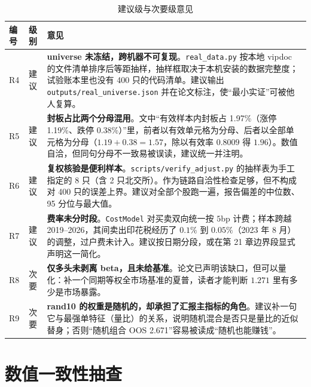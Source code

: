 \documentclass[11pt,a4paper]{ctexart}
\begin{document}
\begin{table}[htbp]
\centering
\caption{建议级与次要级意见}
\label{tab:minor2}
\begin{tabular}{@{}>{\raggedright\arraybackslash}p{0.9cm}>{\raggedright\arraybackslash}p{2.0cm}>{\raggedright\arraybackslash}p{9.7cm}@{}}
\toprule
编号 & 级别 & 意见 \\
\midrule
R4 & 建议 & \textbf{universe 未冻结，跨机器不可复现}。\texttt{real\_data.py} 按本地 vipdoc 的文件清单排序后等距抽样，抽样框取决于本机安装的数据完整度；试验账本里也没有 400 只的代码清单。建议输出 \texttt{outputs/real\_universe.json} 并在论文标注，使“最小实证”可被他人复算。 \\
R5 & 建议 & \textbf{封板占比两个分母混用}。文中“有效样本内封板占 1.97\%（涨停 1.19\%、跌停 0.38\%）”里，前者以有效单元格为分母、后者以全部单元格为分母（$1.19+0.38=1.57$，除以有效率 $0.8009$ 得 $1.96$）。数值自洽，但同句分母不一致易被误读，建议统一并注明。 \\
R6 & 建议 & \textbf{复权核验是便利样本}。\texttt{scripts/verify\_adjust.py} 的抽样表为手工指定的 8 只（含 2 只北交所）。作为链路自洽性检查足够，但不构成对 400 只的误差上界。建议对全部个股跑一遍，报告偏差的中位数、95 分位与最大值。 \\
R7 & 建议 & \textbf{费率未分时段}。\texttt{CostModel} 对买卖双向统一按 $5$bp 计费；样本跨越 2019--2026，其间卖出印花税经历了 $0.1\%$ 到 $0.05\%$（2023 年 8 月）的调整，过户费未计入。建议按日期分段，或在第 21 章边界段显式声明这一简化。 \\
R8 & 次要 & \textbf{仅多头未剥离 beta，且未给基准}。论文已声明该缺口，但可以量化：补一个同期等权全市场基准的夏普，读者才能判断 $1.271$ 里有多少是市场暴露。 \\
R9 & 次要 & \textbf{rand10 的权重是随机的，却承担了汇报主指标的角色}。建议补一句它与最强单特征（量比）的关系，说明随机混合是否只是量比的近似替身；否则“随机组合 OOS 2.671”容易被读成“随机也能赚钱”。 \\
\bottomrule
\end{tabular}
\end{table}

\section{数值一致性抽查}
\end{document}
